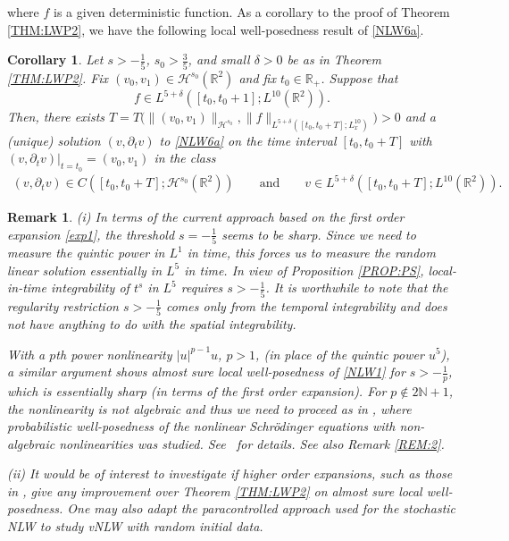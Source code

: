 \documentclass[letterpaper, 11pt,  reqno]{amsart}
\newtheorem{remark}[theorem]{Remark}
\newtheorem{corollary}[theorem]{Corollary}
\newcommand{\1}{\hspace{0.5mm}\text{I}\hspace{0.2mm}}
\newcommand{\noi}{\noindent}
\newcommand{\R}{\mathbb{R}}
\newcommand{\dl}{\delta}
\newcommand{\dt}{\partial_t}
\newcommand{\N}{\mathbb{N}}
\renewcommand{\H}{\mathcal{H}}
\numberwithin{equation}{section}
\numberwithin{theorem}{section}
\begin{document}
\noi
where $f$ is a given deterministic function.
As a corollary to the proof of Theorem \ref{THM:LWP2}, 
we have the following local well-posedness result of \eqref{NLW6a}.

\begin{corollary}\label{COR:LWP4}
Let $s > -\frac 15$,  $s_0 > \frac 35$, 
and small $\dl > 0$  be as in Theorem \ref{THM:LWP2}.
Fix $(v_0, v_1) \in \H^{s_0}(\R^2)$
and fix $t_0\in \R_+$.
Suppose that
\[f \in L^{5+\dl}([t_0, t_0 + 1]; L^{10}(\R^2)).\]
Then, there exists $T = T\big(\| (v_0, v_1) \|_{\H^{s_0}}, 
\|f\|_{L^{5+\dl}([t_0, t_0+ T]; L^{10}_x)}\big) >0$
and 
 a \textup{(}unique\textup{)} 
solution $(v, \dt v)$ 
to \eqref{NLW6a}
on the time interval $[t_0, t_0 + T]$
with $(v, \dt v) |_{t = t_0} = (v_0, v_1)$
in the class
\begin{align*}
 (v, \dt v) \in C([t_0,  t_0 + T]; \H^{s_0} (\R^2))
\qquad \text{and}\qquad 
v\in  L^{5+\dl}([t_0, t_0 + T];  L^{10}(\R^2)).
\end{align*}

\end{corollary}
	





\begin{remark}\label{Remark3.6}\rm
(i) In terms of the current approach based on the first order expansion
\eqref{exp1}, the threshold $s = -\frac 15$ seems to be sharp.
Since we need to measure the quintic power in $L^1$ in time, 
this forces us to measure the random linear solution  essentially in $L^5$
in time.  In view of Proposition \ref{PROP:PS},  
local-in-time integrability of $t^s$ in $L^5$ requires $s > -\frac 15$.
It is worthwhile to note that  the regularity restriction $s > -\frac 15$ comes only from the temporal integrability
and does not have anything to do with the spatial integrability.


With a $p$th power nonlinearity $|u|^{p-1}u$, $p > 1$,  (in place of the quintic power $u^5$), 
a similar argument shows almost sure local well-posedness of \eqref{NLW1} for $s > -\frac 1p$, 
which is essentially sharp
(in terms of the first order expansion). 
For $p \notin 2\N + 1$, the nonlinearity is not algebraic and thus we need to proceed 
as in \cite{OOP}, where probabilistic well-posedness
of the nonlinear Schr\"odinger equations with non-algebraic nonlinearities
was studied.
See~\cite{Liu} for details.
See also Remark \ref{REM:2}.

\smallskip

\noi
(ii) It would be of interest to 
investigate if  higher order expansions, 
such as those in \cite{BOP3, OPTz}, 
give any improvement over Theorem \ref{THM:LWP2}
on almost sure local well-posedness.
One may also adapt the paracontrolled approach 
used for the stochastic NLW
\cite{GKO2, OOTol, Bring, OOTol2}
to study vNLW with random initial data.
\end{remark}
\end{document}
